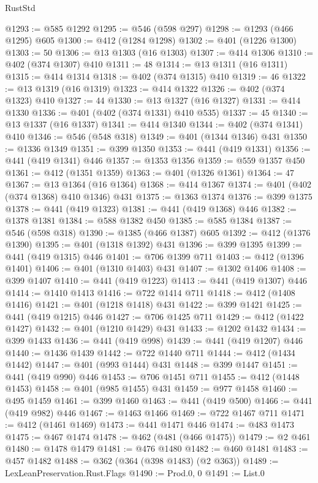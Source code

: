 \begin{lexlean}{RustStd}
\begin{coremodule}
{\begin{coremodule}
{{{{{@1293 := @585 @1292
@1295 := @546 (@598 @297)
@1298 := @1293 (@466 @1295) @605
@1300 := @412 (@1284 @1298)
@1302 := @401 (@1226 @1300)
@1303 := 50
@1306 := @13 @1303 (@16 @1303)
@1307 := @414 @1306
@1310 := @402 (@374 @1307) @410
@1311 := 48
@1314 := @13 @1311 (@16 @1311)
@1315 := @414 @1314
@1318 := @402 (@374 @1315) @410
@1319 := 46
@1322 := @13 @1319 (@16 @1319)
@1323 := @414 @1322
@1326 := @402 (@374 @1323) @410
@1327 := 44
@1330 := @13 @1327 (@16 @1327)
@1331 := @414 @1330
@1336 := @401 (@402 (@374 @1331) @410 @535)
@1337 := 45
@1340 := @13 @1337 (@16 @1337)
@1341 := @414 @1340
@1344 := @402 (@374 @1341) @410
@1346 := @546 (@548 @318)
@1349 := @401 (@1344 @1346) @431
@1350 := @1336 @1349
@1351 := @399 @1350
@1353 := @441 (@419 @1331)
@1356 := @441 (@419 @1341) @446
@1357 := @1353 @1356
@1359 := @559 @1357 @450
@1361 := @412 (@1351 @1359)
@1363 := @401 (@1326 @1361)
@1364 := 47
@1367 := @13 @1364 (@16 @1364)
@1368 := @414 @1367
@1374 := @401 (@402 (@374 @1368) @410 @1346) @431
@1375 := @1363 @1374
@1376 := @399 @1375
@1378 := @441 (@419 @1323)
@1381 := @441 (@419 @1368) @446
@1382 := @1378 @1381
@1384 := @588 @1382 @450
@1385 := @585 @1384
@1387 := @546 (@598 @318)
@1390 := @1385 (@466 @1387) @605
@1392 := @412 (@1376 @1390)
@1395 := @401 (@1318 @1392) @431
@1396 := @399 @1395
@1399 := @441 (@419 @1315) @446
@1401 := @706 @1399 @711
@1403 := @412 (@1396 @1401)
@1406 := @401 (@1310 @1403) @431
@1407 := @1302 @1406
@1408 := @399 @1407
@1410 := @441 (@419 @1223)
@1413 := @441 (@419 @1307) @446
@1414 := @1410 @1413
@1416 := @722 @1414 @711
@1418 := @412 (@1408 @1416)
@1421 := @401 (@1218 @1418) @431
@1422 := @399 @1421
@1425 := @441 (@419 @1215) @446
@1427 := @706 @1425 @711
@1429 := @412 (@1422 @1427)
@1432 := @401 (@1210 @1429) @431
@1433 := @1202 @1432
@1434 := @399 @1433
@1436 := @441 (@419 @998)
@1439 := @441 (@419 @1207) @446
@1440 := @1436 @1439
@1442 := @722 @1440 @711
@1444 := @412 (@1434 @1442)
@1447 := @401 (@993 @1444) @431
@1448 := @399 @1447
@1451 := @441 (@419 @990) @446
@1453 := @706 @1451 @711
@1455 := @412 (@1448 @1453)
@1458 := @401 (@985 @1455) @431
@1459 := @977 @1458
@1460 := @495 @1459
@1461 := @399 @1460
@1463 := @441 (@419 @500)
@1466 := @441 (@419 @982) @446
@1467 := @1463 @1466
@1469 := @722 @1467 @711
@1471 := @412 (@1461 @1469)
@1473 := @441 @1471 @446
@1474 := @483 @1473
@1475 := @467 @1474
@1478 := @462 (@481 (@466 @1475))
@1479 := @2 @461
@1480 := @1478 @1479
@1481 := @476 @1480
@1482 := @460 @1481
@1483 := @457 @1482
@1488 := @362 (@364 (@398 @1483) (@2 @363))
@1489 := LexLeanPreservation.Rust.Flags
@1490 := Prod.{0, 0}
@1491 := List.{0}
}}}}}
\end{coremodule}}
\end{coremodule}
\end{lexlean}
